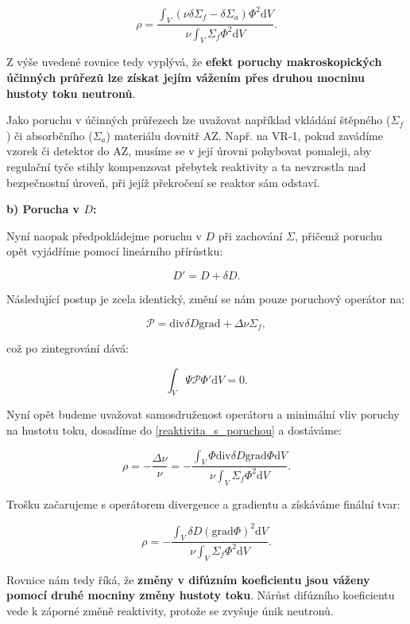 \begin{equation}
  \boxed{
  \rho = \dfrac{\int_V (\nu \delta \Sigma_f - \delta \Sigma_a) \Phi^2 \text{d}V}{\nu \int_V \Sigma_f \Phi^2 \text{d}V}.
  \label{reaktivita_1G_Sigma}}
\end{equation}

Z výše uvedené rovnice tedy vyplývá, že \textbf{efekt poruchy makroskopických účinných průřezů lze získat jejím vážením přes druhou mocninu hustoty toku neutronů}.

Jako poruchu v účinných průřezech lze uvažovat například vkládání štěpného ($\Sigma_f$) či absorbčního ($\Sigma_a$) materiálu dovnitř AZ. Např. na VR-1, pokud zavádíme vzorek či detektor do AZ, musíme se v její úrovni pohybovat pomaleji, aby regulační tyče stihly kompenzovat přebytek reaktivity a ta nevzrostla nad bezpečnostní úroveň, při jejíž překročení se reaktor sám odstaví.

\textbf{b) Porucha v $D$:}

Nyní naopak předpokládejme poruchu v $D$ při zachování $\Sigma$, přičemž poruchu opět vyjádříme pomocí lineárního přírůstku:

$$D' = D + \delta D.$$

Následující postup je zcela identický, změní se nám pouze poruchový operátor na:

$$ \mathcal{P} = \text{div} \delta D \text{grad} + \Delta \nu \Sigma_f, $$

což po zintegrování dává:

$$ \int_V \Psi \mathcal{P} \Phi' \text{d}V = 0. $$

Nyní opět budeme uvažovat samosdruženost operátoru a minimální vliv poruchy na hustotu toku, dosadíme do \eqref{reaktivita_s_poruchou} a dostáváme:

$$ \rho = - \dfrac{\Delta \nu}{\nu} = - \dfrac{\int_V \Phi \text{div} \delta D \text{grad} \Phi \text{d}V}{\nu \int_V \Sigma_f \Phi^2 \text{d}V}. $$

Trošku začarujeme s operátorem divergence a gradientu a získáváme finální tvar:

\begin{equation}
  \boxed{
  \rho = - \dfrac{\int_V \delta D (\text{grad}\Phi)^2 \text{d}V}{\nu \int_V \Sigma_f \Phi^2 \text{d}V}.
  \label{reaktivita_1G_D}}
\end{equation}

Rovnice nám tedy říká, že \textbf{změny v difúzním koeficientu jsou váženy pomocí druhé mocniny změny hustoty toku}. Nárůst difúzního koeficientu vede k záporné změně reaktivity, protože se zvyšuje únik neutronů.

